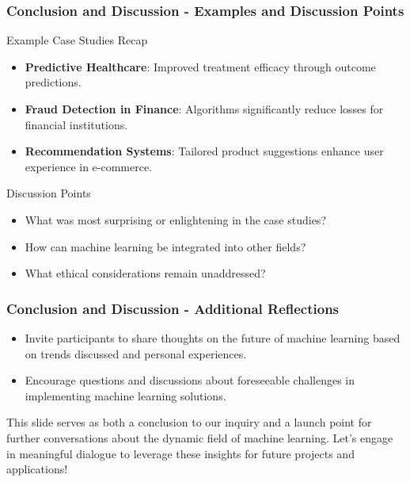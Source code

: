 \documentclass{beamer}
\begin{document}
\begin{frame}[fragile]
    \frametitle{Conclusion and Discussion - Examples and Discussion Points}
    \begin{block}{Example Case Studies Recap}
        \begin{itemize}
            \item \textbf{Predictive Healthcare}: Improved treatment efficacy through outcome predictions.
            \item \textbf{Fraud Detection in Finance}: Algorithms significantly reduce losses for financial institutions.
            \item \textbf{Recommendation Systems}: Tailored product suggestions enhance user experience in e-commerce.
        \end{itemize}
    \end{block}
    
    \begin{block}{Discussion Points}
        \begin{itemize}
            \item What was most surprising or enlightening in the case studies?
            \item How can machine learning be integrated into other fields?
            \item What ethical considerations remain unaddressed?
        \end{itemize}
    \end{block}
\end{frame}

\begin{frame}[fragile]
    \frametitle{Conclusion and Discussion - Additional Reflections}
    \begin{itemize}
        \item Invite participants to share thoughts on the future of machine learning based on trends discussed and personal experiences.
        \item Encourage questions and discussions about foreseeable challenges in implementing machine learning solutions.
    \end{itemize}
    
    This slide serves as both a conclusion to our inquiry and a launch point for further conversations about the dynamic field of machine learning. Let's engage in meaningful dialogue to leverage these insights for future projects and applications!
\end{frame}
\end{document}
